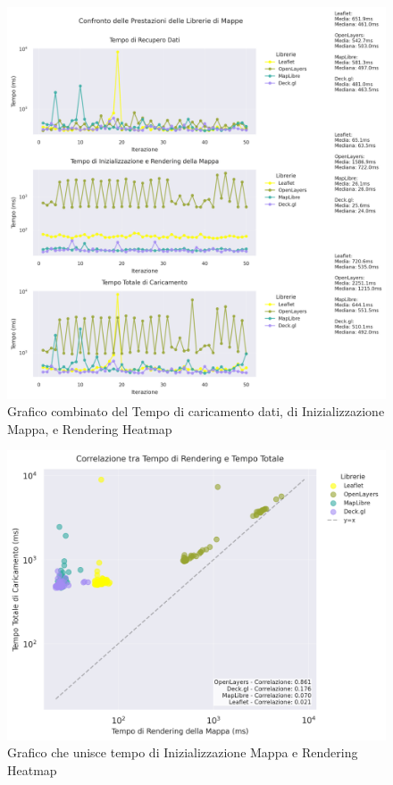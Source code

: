 \begin{figure}[!ht]
    \centering
    \includegraphics[width=\textwidth]{chapters/librerie-plot/data/confronto_benchmark.png}
    \caption{Grafico combinato del Tempo di caricamento dati, di Inizializzazione Mappa, e Rendering Heatmap}
    \label{fig:map_benchmark}
\end{figure}

\begin{figure}[!ht]
    \centering
    \includegraphics[width=\textwidth]{chapters/librerie-plot/data/correlazione_rendering_totale.png}
    \caption{Grafico che unisce tempo di Inizializzazione Mappa e Rendering Heatmap}
    \label{fig:map_xy_plot}
\end{figure}

